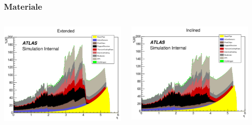 \documentclass{beamer}
\begin{document}
\begin{frame}
\frametitle{Materiale}
\begin{columns}
\begin{column}{.5\textwidth}
\includegraphics[width=\textwidth]{Ext_material}
\end{column}
\begin{column}{.5\textwidth}
\includegraphics[width=\textwidth]{Incl_material}
\end{column}
\end{columns}
\end{frame}
\end{document}

